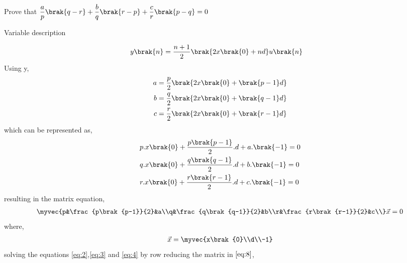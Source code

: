 \documentclass[journal,12pt,twocolumn]{IEEEtran}
\theoremstyle{remark}
\begin{document}
Prove that $\dfrac{a}{p}\brak{q-r}+\dfrac{b}{q}\brak{r-p}+\dfrac{c}{r}\brak{p-q}=0$
\Solution
\fi
\begin{table}[h]
    \centering
    
    \caption{Variable description}
    \label{tab:11.9.2.11.1}
\end{table}
\begin{align}
    y\brak{n}&=\dfrac{n+1}{2}\brak{2x\brak{0}+nd}u\brak{n}
\end{align}
Using y,
\begin{align}
    a&=\dfrac{p}{2}\brak{2x\brak{0}+\brak{p-1}d}\label{eq:2}\\
    b&=\dfrac{q}{2}\brak{2x\brak{0}+\brak{q-1}d}\label{eq:3}\\
    c&=\dfrac{r}{2}\brak{2x\brak{0}+\brak{r-1}d}\label{eq:4}
\end{align}
which can be represented as,
\begin{align}
    &p.x\brak{0}+\dfrac{p\brak{p-1}}{2}.d+a.\brak{-1}=0\\
    &q.x\brak{0}+\dfrac{q\brak{q-1}}{2}.d+b.\brak{-1}=0\\
    &r.x\brak{0}+\dfrac{r\brak{r-1}}{2}.d+c.\brak{-1}=0
\end{align}
resulting in the matrix equation,
\begin{align}
    \myvec{p&\frac{p\brak{p-1}}{2}&a\\q&\frac{q\brak{q-1}}{2}&b\\r&\frac{r\brak{r-1}}{2}&c\\}\vec{x}=0\label{eq:8}
\end{align}
where,
\begin{align}
    \vec{x}=\myvec{x\brak{0}\\d\\-1}
\end{align}
solving the equations \eqref{eq:2},\eqref{eq:3} and \eqref{eq:4} by row reducing the matrix in $\eqref{eq:8}$,
\end{document}
